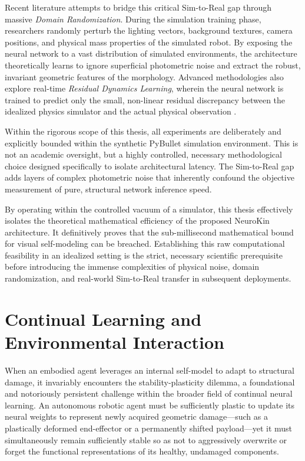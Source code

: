 \documentclass[12pt,a4paper,oneside]{report}
\begin{document}
Recent literature attempts to bridge this critical Sim-to-Real gap through massive \textit{Domain Randomization}. During the simulation training phase, researchers randomly perturb the lighting vectors, background textures, camera positions, and physical mass properties of the simulated robot. By exposing the neural network to a vast distribution of simulated environments, the architecture theoretically learns to ignore superficial photometric noise and extract the robust, invariant geometric features of the morphology. Advanced methodologies also explore real-time \textit{Residual Dynamics Learning}, wherein the neural network is trained to predict only the small, non-linear residual discrepancy between the idealized physics simulator and the actual physical observation \cite{qiu2024swim2real, lim2025splat2real}. 

Within the rigorous scope of this thesis, all experiments are deliberately and explicitly bounded within the synthetic PyBullet simulation environment. This is not an academic oversight, but a highly controlled, necessary methodological choice designed specifically to isolate architectural latency. The Sim-to-Real gap adds layers of complex photometric noise that inherently confound the objective measurement of pure, structural network inference speed. 

By operating within the controlled vacuum of a simulator, this thesis effectively isolates the theoretical mathematical efficiency of the proposed NeuroKin architecture. It definitively proves that the sub-millisecond mathematical bound for visual self-modeling can be breached. Establishing this raw computational feasibility in an idealized setting is the strict, necessary scientific prerequisite before introducing the immense complexities of physical noise, domain randomization, and real-world Sim-to-Real transfer in subsequent deployments.

\section{Continual Learning and Environmental Interaction}

When an embodied agent leverages an internal self-model to adapt to structural damage, it invariably encounters the stability-plasticity dilemma, a foundational and notoriously persistent challenge within the broader field of continual neural learning. An autonomous robotic agent must be sufficiently plastic to update its neural weights to represent newly acquired geometric damage—such as a plastically deformed end-effector or a permanently shifted payload—yet it must simultaneously remain sufficiently stable so as not to aggressively overwrite or forget the functional representations of its healthy, undamaged components.
\end{document}
